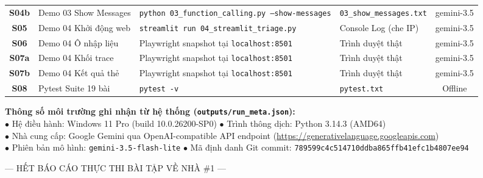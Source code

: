 \documentclass[11pt,a4paper]{article}
\begin{document}
\begin{table}[htbp]
\begin{tabularx}{\textwidth}{c p{3.2cm} p{5.6cm} Y c}
    \textbf{S04b} & Demo 03 Show Messages  & \texttt{python 03\_function\_calling.py --show-messages} & \texttt{03\_show\_messages.txt} & gemini-3.5 \\
    \textbf{S05}  & Demo 04 Khởi động web  & \texttt{streamlit run 04\_streamlit\_triage.py} & Console Log (che IP) & gemini-3.5 \\
    \textbf{S06}  & Demo 04 Ô nhập liệu    & Playwright snapshot tại \texttt{localhost:8501} & Trình duyệt thật & gemini-3.5 \\
    \textbf{S07a} & Demo 04 Khối trace     & Playwright snapshot tại \texttt{localhost:8501} & Trình duyệt thật & gemini-3.5 \\
    \textbf{S07b} & Demo 04 Kết quả thẻ    & Playwright snapshot tại \texttt{localhost:8501} & Trình duyệt thật & gemini-3.5 \\
    \textbf{S08}  & Pytest Suite 19 bài    & \texttt{pytest -v} & \texttt{pytest.txt} & Offline \\
    \bottomrule
  \end{tabularx}
\end{table}

\begin{insightbox}[secondary]
  \textbf{Thông số môi trường ghi nhận từ hệ thống (\texttt{outputs/run\_meta.json}):}\\
  \small
  $\bullet$ Hệ điều hành: Windows 11 Pro (build 10.0.26200-SP0) $\bullet$ Trình thông dịch: Python 3.14.3 (AMD64)\\
  $\bullet$ Nhà cung cấp: Google Gemini qua OpenAI-compatible API endpoint (\url{https://generativelanguage.googleapis.com})\\
  $\bullet$ Phiên bản mô hình: \texttt{gemini-3.5-flash-lite} $\bullet$ Mã định danh Git commit: \texttt{789599c4c514710ddba865ffb41efc1b4807ee94}
\end{insightbox}

\vspace{0.4cm}
\begin{center}
  \small\color{gray}
  --- HẾT BÁO CÁO THỰC THI BÀI TẬP VỀ NHÀ \#1 ---
\end{center}
\end{document}
